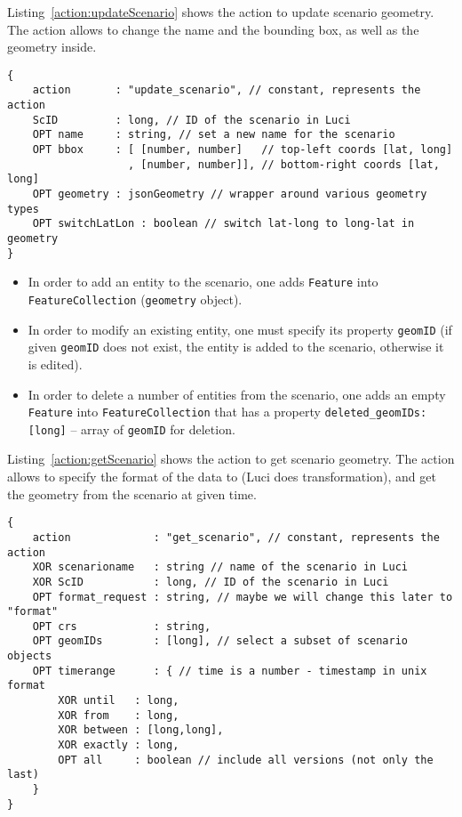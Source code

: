 Listing~\ref{action:updateScenario} shows the action to update scenario geometry.
The action allows to change the name and the bounding box, as well as the geometry inside.
\begin{lstlisting}[caption={JSON action structure for updating a scenario in \ac{Luci}}, label={action:updateScenario}]
{
	action       : "update_scenario", // constant, represents the action
	ScID         : long, // ID of the scenario in Luci
	OPT name     : string, // set a new name for the scenario
	OPT bbox     : [ [number, number]   // top-left coords [lat, long]
	               , [number, number]], // bottom-right coords [lat, long]
	OPT geometry : jsonGeometry // wrapper around various geometry types
	OPT switchLatLon : boolean // switch lat-long to long-lat in geometry
}
\end{lstlisting}
\begin{itemize}
\item In order to add an entity to the scenario, one adds \texttt{Feature} into \texttt{FeatureCollection} (\texttt{geometry} object).
\item In order to modify an existing entity, one must specify its property \texttt{geomID} (if given \texttt{geomID} does not exist, the entity is added to the scenario, otherwise it is edited).
\item In order to delete a number of entities from the scenario, one adds an empty \texttt{Feature} into \texttt{FeatureCollection} that has a property \texttt{deleted\_geomIDs:[\color{blue}long\color{black}]} -- array of \texttt{geomID} for deletion.
\end{itemize}

Listing~\ref{action:getScenario} shows the action to get scenario geometry.
The action allows to specify the format of the data to (\ac{Luci} does transformation),
and get the geometry from the scenario at given time.
\begin{lstlisting}[caption={JSON action structure for getting a scenario from \ac{Luci}}, label={action:getScenario}]
{
	action             : "get_scenario", // constant, represents the action
	XOR scenarioname   : string // name of the scenario in Luci
	XOR ScID           : long, // ID of the scenario in Luci
	OPT format_request : string, // maybe we will change this later to "format"
	OPT crs            : string,
	OPT geomIDs        : [long], // select a subset of scenario objects
	OPT timerange      : { // time is a number - timestamp in unix format
		XOR until   : long,
		XOR from    : long,
		XOR between : [long,long],
		XOR exactly : long,
		OPT all     : boolean // include all versions (not only the last)
	}
}
\end{lstlisting}


